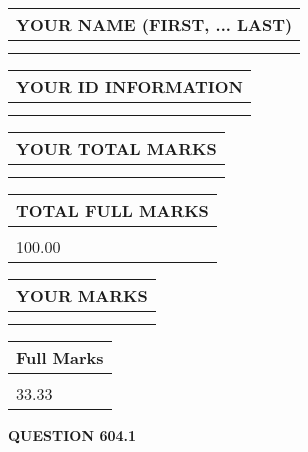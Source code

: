 \documentclass{ctexart}
\begin{document}
   
   
   
\newpage 
\setcounter{page}{ 
   604001 } 
   
   
   
   
\noindent\begin{tabular}{|l|}
\hline
YOUR NAME (FIRST, ... LAST)  \\
\hline
 \\ 
 \\ 
\hline
\end{tabular}
\hspace{0.05in} \begin{tabular}{|l|}
\hline
 YOUR   ID   INFORMATION  \\
\hline
 \\ 
 \\ 
\hline
\end{tabular}
   
   
\vspace{0.2in}\noindent\begin{tabular}{|l|}
\hline
YOUR TOTAL MARKS  \\
\hline
 \\ 
 \\ 
\hline
\end{tabular}
\hspace{0.05in} \begin{tabular}{|l|}
\hline
TOTAL FULL MARKS  \\
\hline
 \\ 
100.00 \\
\hline
\end{tabular}
   
   
 \vspace{0.2in}
 
 
 
 
   
   
  
\vspace{0.2in}
  
\noindent\begin{tabular}{|l|}
\hline
 YOUR MARKS  \\
\hline
 \\ 
 \\ 
\hline
\end{tabular}
\hspace{0.05in} \begin{tabular}{|l|}
\hline
 Full Marks  \\
\hline
 \\ 
33.33 \\
\hline
\end{tabular}
{\textbf{\Large{QUESTION
604.1 
}}}
  
\end{document}
